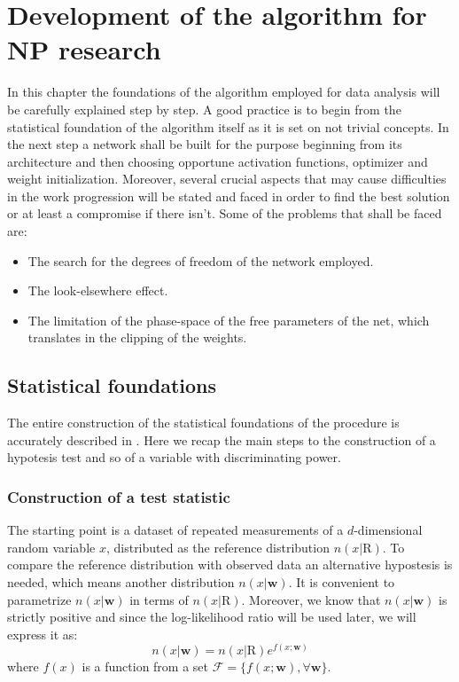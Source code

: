 \chapter{Development of the algorithm for NP research}
\label{chap:Z_5D}





In this chapter the foundations of the algorithm employed for data analysis will be carefully explained step by step. A good practice is to begin from the statistical foundation of the algorithm itself as it is set on not trivial concepts. In the next step a network shall be built for the purpose beginning from its architecture and then choosing opportune activation functions, optimizer and weight initialization. Moreover, several crucial aspects that may cause difficulties in the work progression will be stated and faced in order to find the best solution or at least a compromise if there isn't. Some of the problems that shall be faced are:
\begin{itemize}
	\item The search for the degrees of freedom of the network employed.
	\item The look-elsewhere effect.
	\item The limitation of the phase-space of the free parameters of the net, which translates in the clipping of the weights.
\end{itemize}





\section{Statistical foundations}
The entire construction of the statistical foundations of the procedure is accurately described in \cite{wulzer}. Here we recap the main steps to the construction of a hypotesis test and so of a variable with discriminating power. 



\subsection{Construction of a test statistic}
The starting point is a dataset of repeated measurements of a $d$-dimensional random variable $x$, distributed as the reference distribution $n(x|\mathrm{R})$. To compare the reference distribution with observed data an alternative hypostesis is needed, which means another distribution $n(x|\mathbf{w})$. It is convenient to parametrize $n(x|\mathbf{w})$ in terms of $n(x|\mathrm{R})$. Moreover, we know that $n(x|\mathbf{w})$ is strictly positive and since the log-likelihood ratio will be used later, we will express it as:
\begin{equation}
	n(x|\mathbf{w}) = n(x|\mathrm{R}) e^{f(x;\mathbf{w})}
\end{equation}
where $f(x)$ is a function from a set $\mathcal{F} = \{ f(x;\mathbf{w}), \forall \mathbf{w} \}$.

